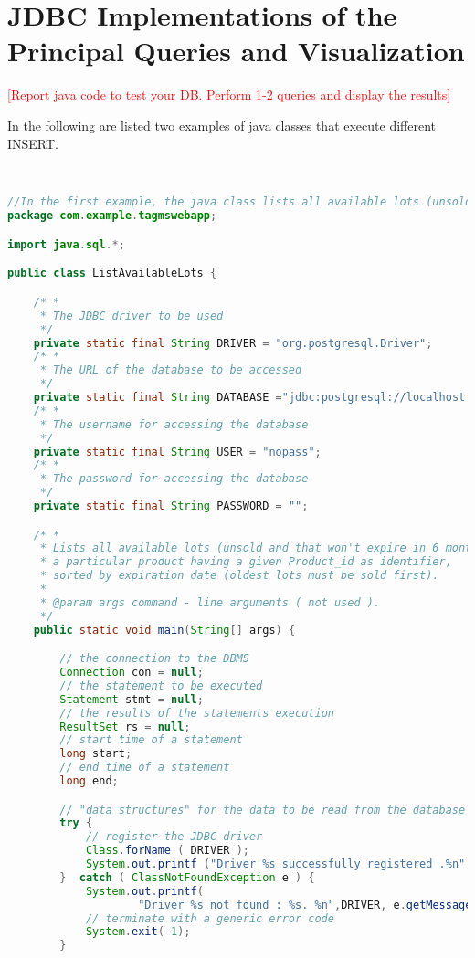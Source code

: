 \section{JDBC Implementations of the Principal Queries and Visualization}
\textcolor{red}{[Report java code to test your DB. Perform 1-2 queries and display the results]}

In the following are listed two examples of java classes that execute different INSERT.



\begin{lstlisting}[language=JAVA,
commentstyle = \color{gray},
keywordstyle = \color{blue}, 
stringstyle = \color{ForestGreen}, 
rulecolor = \color{black},
breaklines=true,
basicstyle=\ttfamily\footnotesize,
showstringspaces=false]


//In the first example, the java class lists all available lots (unsold and that won't expire in 6 months) containing a particular product having a given Product_id as identifier, sorted by expiration date (oldest lots must be sold first).
package com.example.tagmswebapp;

import java.sql.*;

public class ListAvailableLots {

    /* *
     * The JDBC driver to be used
     */
    private static final String DRIVER = "org.postgresql.Driver";
    /* *
     * The URL of the database to be accessed
     */
    private static final String DATABASE ="jdbc:postgresql://localhost:5432/tagmsdb";
    /* *
     * The username for accessing the database
     */
    private static final String USER = "nopass";
    /* *
     * The password for accessing the database
     */
    private static final String PASSWORD = "";

    /* *
     * Lists all available lots (unsold and that won't expire in 6 months) containing
     * a particular product having a given Product_id as identifier,
     * sorted by expiration date (oldest lots must be sold first).
     *
     * @param args command - line arguments ( not used ).
     */
    public static void main(String[] args) {

        // the connection to the DBMS
        Connection con = null;
        // the statement to be executed
        Statement stmt = null;
        // the results of the statements execution
        ResultSet rs = null;
        // start time of a statement
        long start;
        // end time of a statement
        long end;

        // "data structures" for the data to be read from the database
        try {
            // register the JDBC driver
            Class.forName ( DRIVER );
            System.out.printf ("Driver %s successfully registered .%n", DRIVER );
        }  catch ( ClassNotFoundException e ) {
            System.out.printf(
                    "Driver %s not found : %s. %n",DRIVER, e.getMessage());
            // terminate with a generic error code
            System.exit(-1);
        }


\end{lstlisting}

